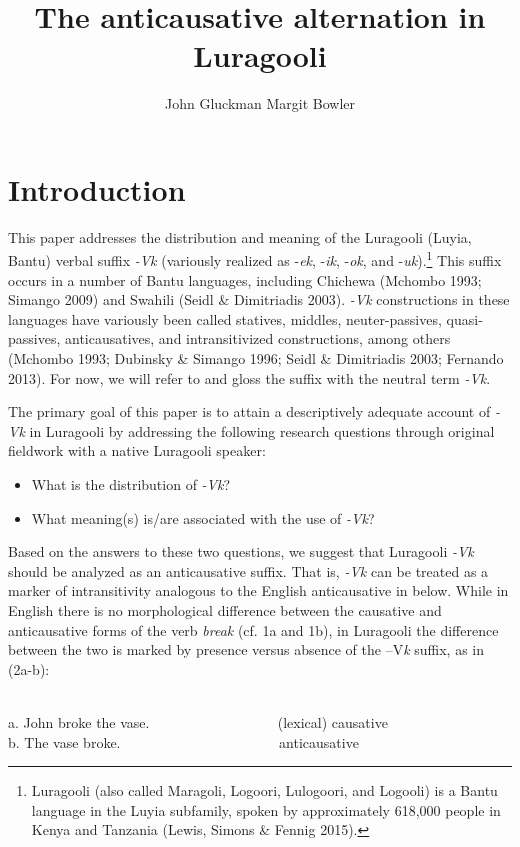 \documentclass[output=paper]{langsci/langscibook}
\title{The anticausative alternation in Luragooli}
\author{%
 John Gluckman\affiliation{UCLA}\lastand 
 Margit Bowler \affiliation{UCLA}
}
\begin{document}
\section{Introduction}

This paper addresses the distribution and meaning of the Luragooli (Luyia, Bantu) verbal suffix \textit{-Vk} (variously realized as -\textit{ek}, -\textit{ik}, -\textit{ok}, and -\textit{uk}).\footnote{ Luragooli (also called Maragoli, Logoori, Lulogoori, and Logooli) is a Bantu language in the Luyia subfamily, spoken by approximately 618,000 people in Kenya and Tanzania (Lewis, Simons \& Fennig 2015).} This suffix occurs in a number of Bantu languages, including Chichewa (Mchombo 1993; Simango 2009) and Swahili (Seidl \& Dimitriadis 2003). \textit{-Vk} constructions in these languages have variously been called statives, middles, neuter-passives, quasi-passives, anticausatives, and intransitivized constructions, among others (Mchombo 1993; Dubinsky \& Simango 1996; Seidl \& Dimitriadis 2003; Fernando 2013). For now, we will refer to and gloss the suffix with the neutral term \textit{-Vk}.

The primary goal of this paper is to attain a descriptively adequate account of \textit{-Vk} in Luragooli by addressing the following research questions through original fieldwork with a native Luragooli speaker:

\begin{itemize}
\item What is the distribution of \textit{-Vk}?
\item What meaning(s) is/are associated with the use of \textit{-Vk}?
\end{itemize}

Based on the answers to these two questions, we suggest that Luragooli \textit{-Vk }should be analyzed as an anticausative suffix. That is, \textit{-Vk} can be treated as a marker of intransitivity analogous to the English anticausative in  below. While in English there is no morphological difference between the causative and anticausative forms of the verb \textit{break }(cf. 1a and 1b), in Luragooli the difference between the two is marked by presence versus absence of the –V\textit{k }suffix, as in (2a-b):


\ea\label{exx:}
\ea
{}\\
 a.  John broke the vase.~~~ ~~~ ~~~ ~~~ ~~~       (lexical) causative \\
 b.  The vase broke. ~~~ ~~~ ~~~ ~~~ ~~~ ~~~       anticausative \\
 \z
\z
\end{document}
